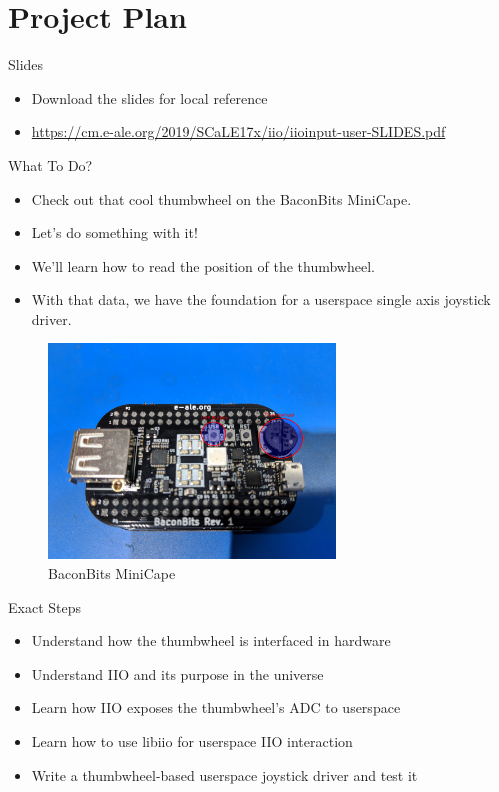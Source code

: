 \section{Project Plan}

\begin{frame}
	{Slides}

	\begin{itemize}
		\item
			Download the slides for local reference
		\item
			\url{https://cm.e-ale.org/2019/SCaLE17x/iio/iioinput-user-SLIDES.pdf}
	\end{itemize}
\end{frame}

\begin{frame}
	{What To Do?}

	\begin{itemize}
		\item
			Check out that cool thumbwheel on the BaconBits MiniCape.
		\item
			Let's do something with it!
		\item
			We'll learn how to read the position of the thumbwheel.
		\item
			With that data, we have the foundation for a userspace single axis joystick driver.
	\end{itemize}

	     \begin{figure}[H]
		     \includegraphics[width=3in]{IMAGES/baconbits-annotated}
				       \caption{BaconBits MiniCape}
	     \end{figure}
\end{frame}


\begin{frame}
	{Exact Steps}
	\begin{itemize}
		\item
			Understand how the thumbwheel is interfaced in hardware
		\item
			Understand IIO and its purpose in the universe
		\item
			Learn how IIO exposes the thumbwheel's ADC to userspace
		\item
			Learn how to use libiio for userspace IIO interaction
		\item
			Write a thumbwheel-based userspace joystick driver and test it
	\end{itemize}
\end{frame}
